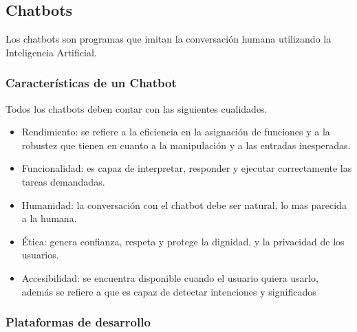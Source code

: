\subsection{Chatbots}
Los chatbots son programas que imitan la conversación humana utilizando la Inteligencia Artificial.\cite{UniversityRelatedFAQS}
\subsubsection{Características de un Chatbot}
Todos los chatbots deben contar con las siguientes cualidades. \cite{evaluating_quality}
\begin{itemize}
    \item Rendimiento: se refiere a la eficiencia en la asignación de funciones y a la robustez que tienen en cuanto a la manipulación y a las entradas inesperadas.
    \item Funcionalidad: es capaz de interpretar, responder y ejecutar  correctamente las tareas demandadas.
    \item Humanidad: la conversación con el chatbot debe ser natural, lo mas parecida a la humana.
    \item Ética: genera confianza, respeta y protege la dignidad, y la privacidad de los usuarios.
    \item Accesibilidad: se encuentra disponible cuando el usuario quiera usarlo, además se refiere a que es capaz de detectar intenciones y significados
\end{itemize}
\subsubsection{Plataformas de desarrollo}
